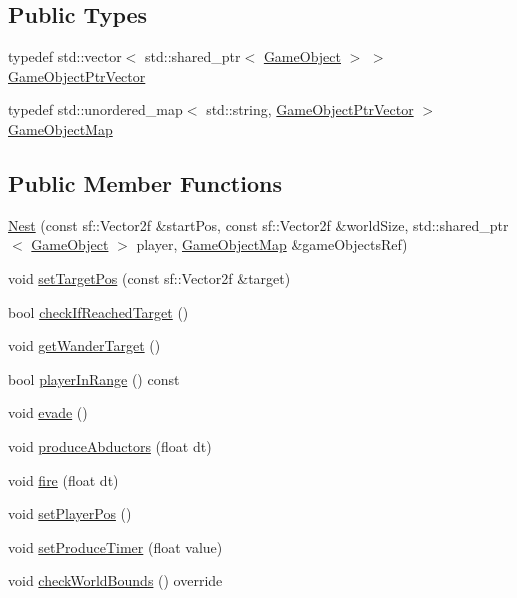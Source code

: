 \subsection*{Public Types}
\begin{DoxyCompactItemize}
\item 
typedef std\+::vector$<$ std\+::shared\+\_\+ptr$<$ \hyperlink{class_game_object}{Game\+Object} $>$ $>$ \hyperlink{class_nest_a75b288e175b0c96fe143e536ffe39b9f}{Game\+Object\+Ptr\+Vector}
\item 
typedef std\+::unordered\+\_\+map$<$ std\+::string, \hyperlink{class_nest_a75b288e175b0c96fe143e536ffe39b9f}{Game\+Object\+Ptr\+Vector} $>$ \hyperlink{class_nest_ace85746dc6b1b17dd63dd22c48082e4c}{Game\+Object\+Map}
\end{DoxyCompactItemize}
\subsection*{Public Member Functions}
\begin{DoxyCompactItemize}
\item 
\hyperlink{class_nest_a2ff01e11d59383d9121c836ea3eb966b}{Nest} (const sf\+::\+Vector2f \&start\+Pos, const sf\+::\+Vector2f \&world\+Size, std\+::shared\+\_\+ptr$<$ \hyperlink{class_game_object}{Game\+Object} $>$ player, \hyperlink{class_nest_ace85746dc6b1b17dd63dd22c48082e4c}{Game\+Object\+Map} \&game\+Objects\+Ref)
\item 
void \hyperlink{class_nest_ac9f5891628b3474d60887521ff54d668}{set\+Target\+Pos} (const sf\+::\+Vector2f \&target)
\item 
bool \hyperlink{class_nest_ad92f26aa5d487d36eec0818e9d71e9d7}{check\+If\+Reached\+Target} ()
\item 
void \hyperlink{class_nest_a7cf537ca64aef6173067915a15e0cdec}{get\+Wander\+Target} ()
\item 
bool \hyperlink{class_nest_a2a6648d13e1eb6b8634f6f0b618d6da3}{player\+In\+Range} () const
\item 
void \hyperlink{class_nest_ad5b9ccc37ae3a0d503c524f808a8fd1c}{evade} ()
\item 
void \hyperlink{class_nest_aa3b2b3ff5ebbf25c942e2622130d8446}{produce\+Abductors} (float dt)
\item 
void \hyperlink{class_nest_ac8d249dfb5462f7942a1f898099ca0af}{fire} (float dt)
\item 
void \hyperlink{class_nest_ac880ed51665003fe201b8efa9f34ab46}{set\+Player\+Pos} ()
\item 
void \hyperlink{class_nest_a8788296c980a2aa1d4f7cac073650496}{set\+Produce\+Timer} (float value)
\item 
void \hyperlink{class_nest_ab62ba42fc4c7e4c043f29e59ab8c8ea3}{check\+World\+Bounds} () override
\end{DoxyCompactItemize}
